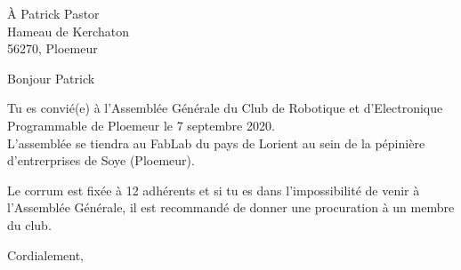 \documentclass[12pt]{lettre}
\makeatletter
\newcommand{\NoRule}{\renewcommand*{\rule@length}{0}}
\makeatother
\begin{document}
   
   
   \begin{letter}{À Patrick Pastor\\Hameau de Kerchaton\\
               56270, Ploemeur
                  }
      \NoRule
      \nodate
      \nolieu%
      \address{Nicolas Le Guerroué\\20 rue du roi Arthur\\
               56270, Ploemeur}
      \nofax
      \opening{Bonjour Patrick}
      
      Tu es convié(e) à l'Assemblée Générale du Club de Robotique et d'Electronique Programmable de Ploemeur le 7 septembre 2020. \\
      
      L'assemblée se tiendra au FabLab du pays de Lorient au sein de la pépinière d'entrerprises de Soye (Ploemeur).
      
      Le corrum est fixée à 12 adhérents et si tu es dans l'impossibilité de venir à l'Assemblée Générale, il est recommandé de donner une procuration à un membre du club.
      
      \closing{Cordialement, }
     
   \end{letter}
   
   
\end{document}
